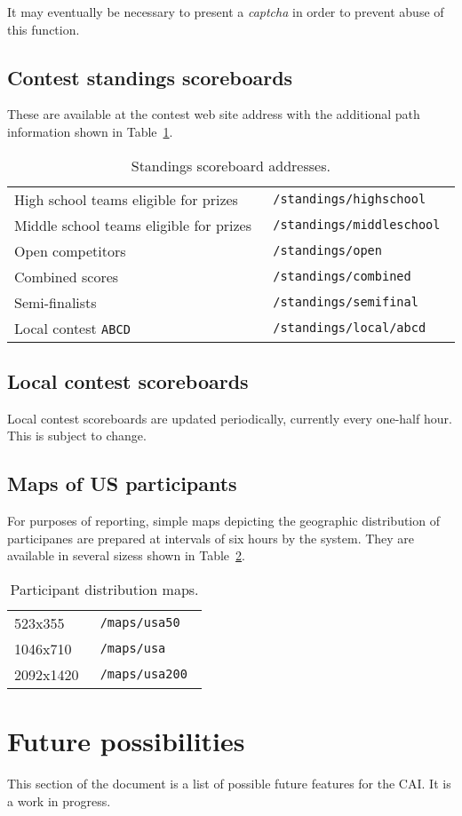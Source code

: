 \documentclass[11pt,letterpaper]{refart}
\newenvironment{fulltable}[1][tbp]
 {\begin{table}[#1]%
  \hspace*{-\leftmarginwidth}%
  \begin{minipage}{\fullwidth}}
 {\end{minipage}\end{table}}
\begin{document}
It may eventually be necessary to present a \emph{captcha} in order to prevent abuse 
of this function. 

\subsection{Contest standings scoreboards}
These are available at the contest web site address with the additional
path information shown in Table~\ref{tbl:scoreboards}.\
\begin{fulltable}
\centering
\caption{Standings scoreboard addresses.}
\begin{tabular}{l>{\tt}l}
High school teams eligible for prizes & /standings/highschool \\
Middle school teams eligible for prizes & /standings/middleschool \\
Open competitors & /standings/open \\
Combined scores & /standings/combined \\
Semi-finalists & /standings/semifinal \\
Local contest \texttt{ABCD} & /standings/local/abcd
\end{tabular}
\label{tbl:scoreboards}
\end{fulltable}

\subsection{Local contest scoreboards}
Local contest scoreboards are updated periodically, currently every one-half hour.
This is subject to change.

\subsection{Maps of US participants}
For purposes of reporting, simple maps depicting the geographic distribution
of participanes are prepared at intervals of six hours by the system.  They
are available in several sizess shown in Table~\ref{tbl:maps}.\
\begin{table}
\centering
\caption{Participant distribution maps.}
\begin{tabular}{l>{\tt}l}
523x355 & /maps/usa50  \\
1046x710 & /maps/usa \\
 2092x1420 & /maps/usa200 
\end{tabular}
\label{tbl:maps}
\end{table}

\section{Future possibilities}
This section of the document is a list of possible future features for the CAI. It is a work
in progress.
\end{document}
